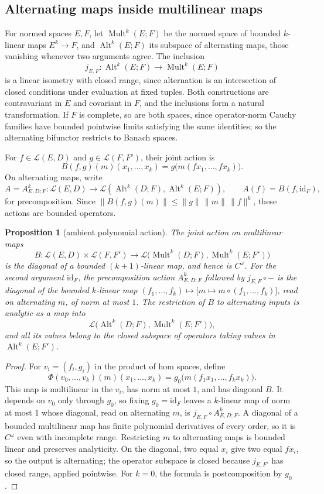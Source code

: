 \documentclass[11pt]{amsart}
\newtheorem{proposition}[theorem]{Proposition}
\theoremstyle{definition}
\theoremstyle{remark}
\numberwithin{equation}{section}
\newcommand{\cL}{\mathcal L}
\newcommand{\Alt}{\operatorname{Alt}}
\newcommand{\Mult}{\operatorname{Mult}}
\newcommand{\id}{\mathrm{id}}
\newcommand{\norm}[1]{\lVert #1\rVert}
\theoremstyle{plain}
\theoremstyle{definition}
\theoremstyle{plain}
\begin{document}
\subsection{Alternating maps inside multilinear maps}

For normed spaces $E,F$, let $\Mult^k(E;F)$ be the normed space of bounded $k$-linear maps $E^k\to F$, and $\Alt^k(E;F)$ its subspace of alternating maps, those vanishing whenever two arguments agree. The inclusion
\[
 j_{E,F}\colon\Alt^k(E;F)\longrightarrow\Mult^k(E;F)
\]
is a linear isometry with closed range, since alternation is an intersection of closed conditions under evaluation at fixed tuples. Both constructions are contravariant in $E$ and covariant in $F$, and the inclusions form a natural transformation. If $F$ is complete, so are both spaces, since operator-norm Cauchy families have bounded pointwise limits satisfying the same identities; so the alternating bifunctor restricts to Banach spaces.

For $f\in\cL(E,D)$ and $g\in\cL(F,F')$, their joint action is
\[
 B(f,g)(m)(x_1,\ldots,x_k)
 =g\bigl(m(fx_1,\ldots,fx_k)\bigr).
\]
On alternating maps, write
\[
 A=A^k_{E,D;F}\colon\cL(E,D)\longrightarrow
 \cL(\Alt^k(D;F),\Alt^k(E;F)),\qquad A(f)=B(f,\id_F),
\]
for precomposition. Since $\norm{B(f,g)(m)}\le\norm g\,\norm m\,\norm f^k$, these actions are bounded operators.

\begin{proposition}[ambient polynomial action]\label{prop:ambient-polynomial}
The joint action on multilinear maps
\[
 B\colon\cL(E,D)\times\cL(F,F')
 \longrightarrow\cL\bigl(\Mult^k(D;F),\Mult^k(E;F')\bigr)
\]
is the diagonal of a bounded $(k+1)$-linear map, and hence is $C^\omega$. For the second argument $\id_F$, the precomposition action $A^k_{E,D;F}$ followed by $j_{E,F}\circ{-}$ is the diagonal of the bounded $k$-linear map $(f_1,\ldots,f_k)\mapsto\bigl[m\mapsto m\circ(f_1,\ldots,f_k)\bigr]$, read on alternating $m$, of norm at most $1$. The restriction of $B$ to alternating inputs is analytic as a map into
\[
 \cL\bigl(\Alt^k(D;F),\Mult^k(E;F')\bigr),
\]
and all its values belong to the closed subspace of operators taking values in $\Alt^k(E;F')$.
\end{proposition}

\begin{proof}
For $v_i=(f_i,g_i)$ in the product of hom spaces, define
\[
 \Phi(v_0,\ldots,v_k)(m)(x_1,\ldots,x_k)
 =g_0\bigl(m(f_1x_1,\ldots,f_kx_k)\bigr).
\]
This map is multilinear in the $v_i$, has norm at most $1$, and has diagonal $B$. It depends on $v_0$ only through $g_0$, so fixing $g_0=\id_F$ leaves a $k$-linear map of norm at most $1$ whose diagonal, read on alternating $m$, is $j_{E,F}\circ A^k_{E,D;F}$. A diagonal of a bounded multilinear map has finite polynomial derivatives of every order, so it is $C^\omega$ even with incomplete range. Restricting $m$ to alternating maps is bounded linear and preserves analyticity. On the diagonal, two equal $x_i$ give two equal $fx_i$, so the output is alternating; the operator subspace is closed because $j_{E,F'}$ has closed range, applied pointwise. For $k=0$, the formula is postcomposition by $g_0$.
\end{proof}
\end{document}
